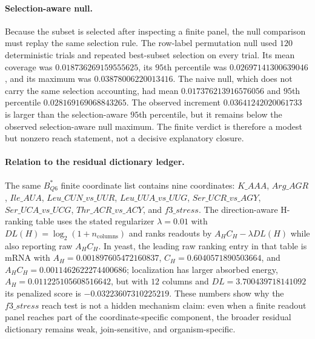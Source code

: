 \paragraph{Selection-aware null.}
Because the subset is selected after inspecting a finite panel, the null comparison must replay the same selection rule.  The row-label permutation null used $120$ deterministic trials and repeated best-subset selection on every trial.  Its mean coverage was $0.018736269159555625$, its $95$th percentile was $0.02697141300639046$, and its maximum was $0.03878006220013416$.  The naive null, which does not carry the same selection accounting, had mean $0.017376213916576056$ and $95$th percentile $0.028169169068843265$.  The observed increment $0.03641242020061733$ is larger than the selection-aware $95$th percentile, but it remains below the observed selection-aware null maximum.  The finite verdict is therefore a modest but nonzero reach statement, not a decisive explanatory closure.

\paragraph{Relation to the residual dictionary ledger.}
The same $B^{*}_{Q6}$ finite coordinate list contains nine coordinates: $K\_AAA$, $Arg\_AGR$, $Ile\_AUA$, $Leu\_CUN\_vs\_UUR$, $Leu\_UUA\_vs\_UUG$, $Ser\_UCR\_vs\_AGY$, $Ser\_UCA\_vs\_UCG$, $Thr\_ACR\_vs\_ACY$, and $f3\_stress$.  The direction-aware H-ranking table uses the stated regularizer $\lambda=0.01$ with $DL(H)=\log_2(1+n_{\mathrm{columns}})$ and ranks readouts by $A_H C_H-\lambda DL(H)$ while also reporting raw $A_H C_H$.  In yeast, the leading raw ranking entry in that table is mRNA with $A_H=0.001897605472160837$, $C_H=0.6040571890503664$, and $A_HC_H=0.0011462622274400686$; localization has larger absorbed energy, $A_H=0.011225105608516642$, but with $12$ columns and $DL=3.700439718141092$ its penalized score is $-0.03223607310225219$.  These numbers show why the $f3\_stress$ reach test is not a hidden mechanism claim: even when a finite readout panel reaches part of the coordinate-specific component, the broader residual dictionary remains weak, join-sensitive, and organism-specific.

